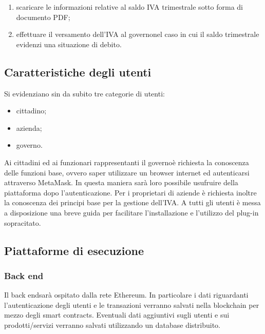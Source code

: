 \begin{itemize}
\begin{enumerate}[label=\alph*.]
\begin{enumerate}[label=\roman*.]
			\item \textbf{l'azienda-cliente ha selezionato la dilazione\glosp del pagamento}: viene inviata la conferma dell'ordine. Successivamente l'azienda può confermare o rifiutare l'ordine. In caso di conferma il venditore procede con la consegna del prodotto/servizio, mentre il compratore è legalmente vincolato al pagamento futuro.  
		\end{enumerate}
		In entrambi i casi, al verificarsi del rifiuto della proposta d'ordine, la somma trattenuta viene restituita al compratore, mentre il venditore non invia nessun prodotto/servizio;
		\item scaricare le informazioni relative al saldo IVA trimestrale sotto forma di documento PDF;
		\item effettuare il versamento dell'IVA al governo\glosp nel caso in cui il saldo trimestrale evidenzi una situazione di debito.
	\end{enumerate}

\end{itemize}
\subsection{Caratteristiche degli utenti}
Si evidenziano sin da subito tre categorie di utenti:
\begin{itemize}
	\item cittadino;
	\item azienda;
	\item governo\glo.
\end{itemize}
Ai cittadini ed ai funzionari rappresentanti il governo\glosp è richiesta la conoscenza delle funzioni base, ovvero saper utilizzare un browser internet ed autenticarsi attraverso MetaMask\glo. In questa maniera sarà loro possibile usufruire  della piattaforma dopo l'autenticazione. Per i proprietari di aziende è richiesta inoltre la conoscenza dei principi base per la gestione dell'IVA. A tutti gli utenti è messa a disposizione una breve guida per facilitare l'installazione e l'utilizzo del plug-in sopracitato. 

\subsection{Piattaforme di esecuzione}
\subsubsection{Back end}
Il back end\glosp sarà ospitato dalla rete Ethereum\glo. In particolare i dati riguardanti l'autenticazione degli utenti e le transazioni verranno salvati nella blockchain per mezzo degli smart contracts\glo. Eventuali dati aggiuntivi sugli utenti e sui prodotti/servizi verranno salvati utilizzando un database distribuito.

